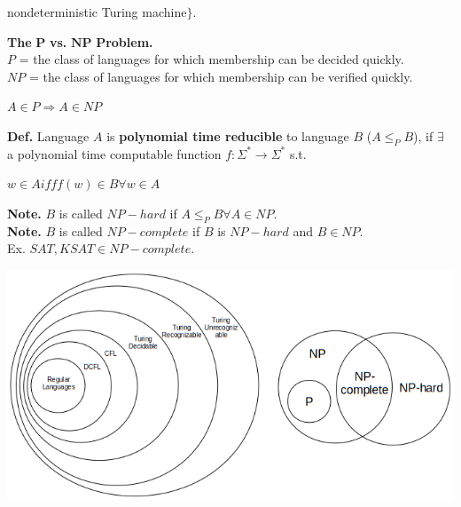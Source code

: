 \documentclass[12pt]{article}
\begin{document}
\begin{multicols}{2}
\begin{center}
nondeterministic Turing machine$\rbrace .$
\end{center}
\textbf{The} $\textbf{P}$ \textbf{vs.} $\textbf{NP}$ \textbf{Problem.}\\
$P$ = the class of languages for which membership can be decided quickly.\\
$NP$ = the class of languages for which membership can be verified quickly.
\begin{center}
$A \in P \Rightarrow A \in NP$ 
\end{center}
\textbf{Def.} Language $A$ is \textbf{polynomial time reducible} to language $B$ ($A \leqslant_{P} B$), if $\exists$ a polynomial time computable function $f: \Sigma^{*} \rightarrow \Sigma^{*}$ s.t.
\begin{center}
$w \in A iff f(w) \in B \forall w \in A$
\end{center}
\textbf{Note.} $B$ is called $NP-hard$ if $A \leqslant_{P} B \forall A \in NP.$\\
\textbf{Note.} $B$ is called $NP-complete$ if $B$ is $NP-hard$ and $B \in NP.$\\
Ex. $SAT, KSAT \in NP-complete.$
\end{multicols}
\includegraphics[scale=0.75]{6.png} 
\end{document}
